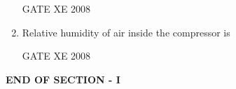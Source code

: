 \documentclass[12pt]{article}
\begin{document}
\begin{enumerate}
GATE XE 2008

\item Relative humidity of air inside the compressor is

\begin{enumerate}
\end{enumerate}

GATE XE 2008

\end{enumerate}

\begin{center}
    \textbf{END OF SECTION - I}
\end{center}
\end{document}
